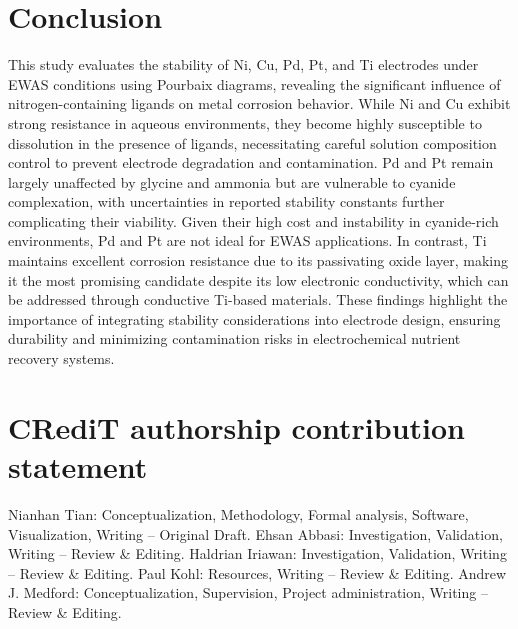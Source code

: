 \documentclass[journal=jacsat,manuscript=article]{achemso}
\begin{document}
\section{Conclusion}
This study evaluates the stability of Ni, Cu, Pd, Pt, and Ti electrodes under EWAS conditions using Pourbaix diagrams, revealing the significant influence of nitrogen-containing ligands on metal corrosion behavior. While Ni and Cu exhibit strong resistance in aqueous environments, they become highly susceptible to dissolution in the presence of  ligands, necessitating careful solution composition control to prevent electrode degradation and contamination. Pd and Pt remain largely unaffected by glycine and ammonia but are vulnerable to cyanide complexation, with uncertainties in reported stability constants further complicating their viability. Given their high cost and instability in cyanide-rich environments, Pd and Pt are not ideal for EWAS applications. In contrast, Ti maintains excellent corrosion resistance due to its passivating oxide layer, making it the most promising candidate despite its low electronic conductivity, which can be addressed through conductive Ti-based materials. These findings highlight the importance of integrating stability considerations into electrode design, ensuring durability and minimizing contamination risks in electrochemical nutrient recovery systems.


\section{CRediT authorship contribution statement}
Nianhan Tian: Conceptualization, Methodology, Formal analysis, Software, Visualization, Writing – Original Draft.  
Ehsan Abbasi: Investigation, Validation, Writing – Review \& Editing.  
Haldrian Iriawan: Investigation, Validation, Writing – Review \& Editing.  
Paul Kohl: Resources, Writing – Review \& Editing.  
Andrew J. Medford: Conceptualization, Supervision, Project administration, Writing – Review \& Editing.


\end{document}
